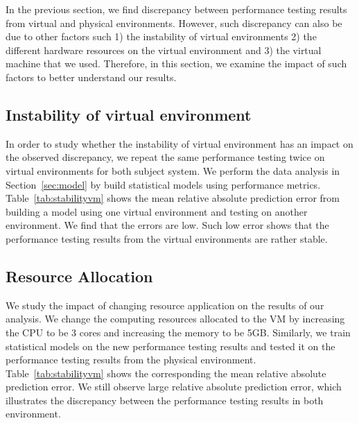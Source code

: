 In the previous section, we find discrepancy between performance testing results from virtual and physical environments. However, such discrepancy can also be due to other factors such 1) the instability of virtual environments 2) the different hardware resources on the virtual environment and 3) the virtual machine that we used. Therefore, in this section, we examine the impact of such factors to better understand our results. 


\subsection{Instability of virtual environment}

In order to study whether the instability of virtual environment has an impact on the observed discrepancy, we repeat the same performance testing twice on virtual environments for both subject system. We perform the data analysis in Section~\ref{sec:model} by build statistical models using performance metrics. Table~\ref{tab:stabilityvm} shows the mean relative absolute prediction error from building a model using one virtual environment and testing on another environment. We find that the errors are low. Such low error shows that the performance testing results from the virtual environments are rather stable. 






\subsection{Resource Allocation}
We study the impact of changing resource application on the results of our analysis. We change the computing resources allocated to the VM by increasing the CPU to be 3 cores and increasing the memory to be 5GB. Similarly, we train statistical models on the new performance testing results and tested it on the performance testing results from the physical environment. Table~\ref{tab:stabilityvm} shows the corresponding the mean relative absolute prediction error. We still observe large relative absolute prediction error, which illustrates the discrepancy between the performance testing results in both environment. 

